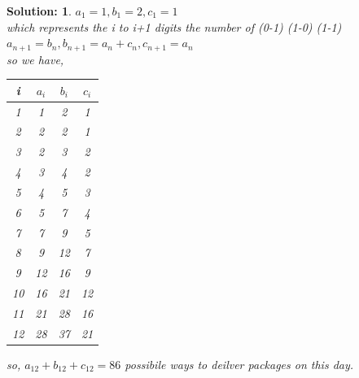 \documentclass{article}
\theoremstyle{break}
\newtheorem*{solution*}{\textbf{Solution:} }
\begin{document}
\begin{solution*}
        $a_1 = 1, b_1 = 2, c_1 = 1$\\
        which represents the i to i+1 digits the number of (0-1) (1-0) (1-1)
        $a_{n+1} = b_{n}, b_{n+1} = a_n+c_n, c_{n+1} = a_n$\\
        so we have,
        \begin{center}
                \begin{tabular}{|c|c|c|c|}
                        \hline
                        i & $a_i$ & $b_i$ & $c_i$\\
                        \hline
                        1 & 1 & 2 & 1 \\
                        \hline
                        2 & 2 & 2 & 1 \\
                        \hline
                        3 & 2 & 3 & 2 \\
                        \hline
                        4 & 3  & 4 & 2 \\
                        \hline
                        5 & 4 & 5 & 3 \\
                        \hline
                        6 & 5 & 7 & 4 \\
                        \hline 
                        7 & 7 & 9 & 5 \\
                        \hline 
                        8 & 9 & 12 & 7 \\
                        \hline
                        9 & 12  & 16 & 9 \\
                        \hline 
                        10 & 16 & 21 & 12 \\
                        \hline
                        11 & 21 & 28 & 16 \\
                        \hline
                        12 & 28 & 37 & 21 \\
                        \hline
                        \end{tabular}
        \end{center}
        so, $a_12 + b_12 + c_12 = 86$ possibile ways to deilver packages on this day.
\end{solution*}
\end{document}
